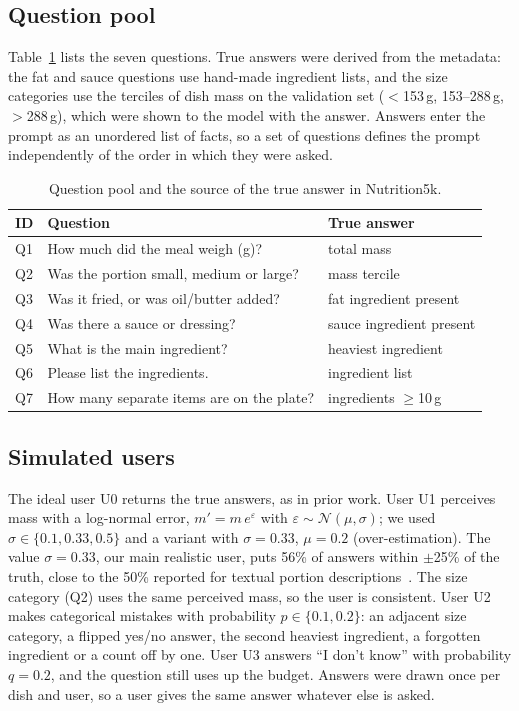 \documentclass[twocolumn]{svjour3}
\begin{document}
\subsection{Question pool}
Table~\ref{tab:questions} lists the seven questions. True answers were derived from the metadata: the fat
and sauce questions use hand-made ingredient lists, and the size categories use the terciles of dish mass on
the validation set ($<$153\,g, 153--288\,g, $>$288\,g), which were shown to the model with the answer.
Answers enter the prompt as an unordered list of facts, so a set of questions defines the prompt
independently of the order in which they were asked.

\begin{table}[t]
  \centering
  \caption{Question pool and the source of the true answer in Nutrition5k.}
  \label{tab:questions}
  \setlength{\tabcolsep}{3pt}
  \begin{tabular}{@{}lp{3.2cm}p{3.1cm}@{}}
    \toprule
    ID & Question & True answer \\
    \midrule
    Q1 & How much did the meal weigh (g)? & total mass \\
    Q2 & Was the portion small, medium or large? & mass tercile \\
    Q3 & Was it fried, or was oil/butter added? & fat ingredient present \\
    Q4 & Was there a sauce or dressing? & sauce ingredient present \\
    Q5 & What is the main ingredient? & heaviest ingredient \\
    Q6 & Please list the ingredients. & ingredient list \\
    Q7 & How many separate items are on the plate? & ingredients $\ge$10\,g \\
    \bottomrule
  \end{tabular}
\end{table}

\subsection{Simulated users}
The ideal user U0 returns the true answers, as in prior work. User U1 perceives mass with a log-normal
error, $m' = m\,e^{\varepsilon}$ with $\varepsilon\sim\mathcal{N}(\mu,\sigma)$; we used $\sigma\in\{0.1, 0.33,
0.5\}$ and a variant with $\sigma=0.33$, $\mu=0.2$ (over-estimation). The value $\sigma=0.33$, our main
realistic user, puts 56\% of answers within $\pm$25\% of the truth, close to the 50\% reported for textual
portion descriptions~\cite{lucassen2021portion}. The size category (Q2) uses the same perceived mass, so the
user is consistent. User U2 makes categorical mistakes with probability $p\in\{0.1, 0.2\}$: an adjacent
size category, a flipped yes/no answer, the second heaviest ingredient, a forgotten ingredient or a count
off by one. User U3 answers ``I don't know'' with probability $q=0.2$, and the question still uses up the
budget. Answers were drawn once per dish and user, so a user gives the same answer whatever else is asked.
\end{document}
